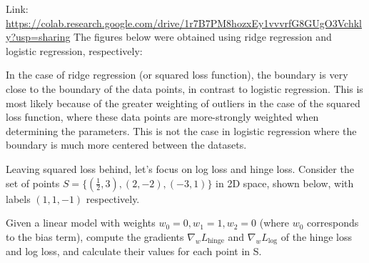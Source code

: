\begin{solution}
  Link: \url{https://colab.research.google.com/drive/1r7B7PM8hozxEy1vvvrfG8GUgO3Vchkly?usp=sharing}
  The figures below were obtained using ridge regression and logistic regression, respectively:
  \begin{figure}[H]
  \end{figure}
  In the case of ridge regression (or squared loss function), the boundary is very close to the boundary of the data points, in contrast to logistic regression. This is most likely because of the greater weighting of outliers in the case of the squared loss function, where these data points are more-strongly weighted when determining the parameters. This is not the case in logistic regression where the boundary is much more centered between the datasets.
\end{solution}

\problem[9]
Leaving squared loss behind, let's focus on log loss and hinge loss. Consider the set of points $S = \{(\frac{1}{2}, 3), (2, -2), (-3, 1)\}$ in 2D space, shown below, with labels $(1, 1, -1)$ respectively.

Given a linear model with weights $w_0 = 0, w_1 = 1, w_2 = 0$ (where $w_0$ corresponds to the bias term), compute the gradients $\nabla_{w}L_{\text{hinge}}$ and $\nabla_{w}L_{\text{log}}$ of the hinge loss and log loss, and calculate their values for each point in S.

